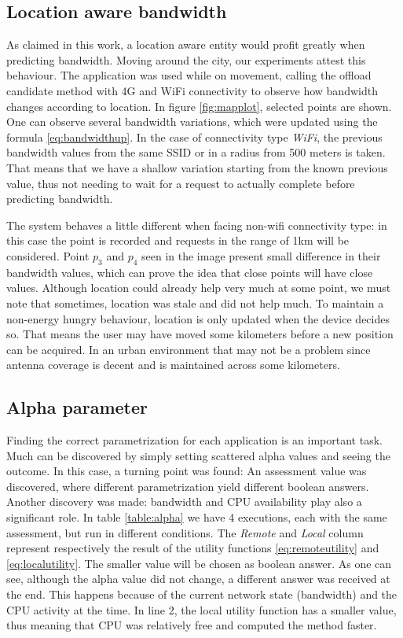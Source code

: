 \documentclass[10pt, conference, letterpaper]{IEEEtran}
\begin{document}
  \subsection{Location aware bandwidth}
  As claimed in this work, a location aware entity would profit greatly when predicting bandwidth. Moving around the city, our experiments attest this behaviour. The application was used while on movement, calling the offload candidate method with 4G and WiFi connectivity to observe how bandwidth changes according to location. In figure \ref{fig:mapplot}, selected points are shown. One can observe several bandwidth variations, which were updated using the formula \ref{eq:bandwidthup}. In the case of connectivity type \textit{WiFi}, the previous bandwidth values from the same SSID or in a radius from 500 meters is taken. That means that we have a shallow variation starting from the known previous value, thus not needing to wait for a request to actually complete before predicting bandwidth.
  
  The system behaves a little different when facing non-wifi connectivity type: in this case the point is recorded and requests in the range of 1km will be considered. Point $p_3$ and $p_4$ seen in the image present small difference in their bandwidth values, which can prove the idea that close points will have close values. Although location could already help very much at some point, we must note that sometimes, location was stale and did not help much. To maintain a non-energy hungry behaviour, location is only updated when the device decides so. That means the user may have moved some kilometers before a new position can be acquired. In an urban environment that may not be a problem since antenna coverage is decent and is maintained across some kilometers.

  \subsection{Alpha parameter}

  Finding the correct parametrization for each application is an important task. Much can be discovered by simply setting scattered alpha values and seeing the outcome. In this case, a turning point was found: An assessment value was discovered, where different parametrization yield different boolean answers. Another discovery was made: bandwidth and CPU availability play also a significant role. In table \ref{table:alpha} we have 4 executions, each with the same assessment, but run in different conditions. The \textit{Remote} and \textit{Local} column represent respectively the result of the utility functions \ref{eq:remoteutility} and \ref{eq:localutility}. The smaller value will be chosen as boolean answer. As one can see, although the alpha value did not change, a different answer was received at the end. This happens because of the current network state (bandwidth) and the CPU activity at the time. In line 2, the local utility function has a smaller value, thus meaning that CPU was relatively free and computed the method faster.
\end{document}
